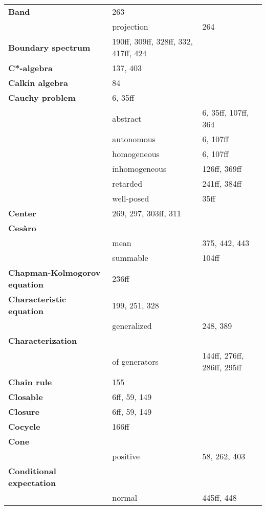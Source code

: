 \documentclass[10pt]{scrartcl}
\begin{document}
\begin{longtable}{>{\bfseries}p{5cm}p{4cm}p{4cm}p{4cm}}
Band 	& 263 \\
	& projection 	& 264 \\

Boundary spectrum 	& 190ff, 309ff, 328ff, 332, 417ff, 424 \\

C*-algebra 	& 137, 403 \\

Calkin algebra 	& 84 \\

Cauchy problem 	& 6, 35ff \\
	& abstract 	& 6, 35ff, 107ff, 364 \\
	& autonomous 	& 6, 107ff \\
	& homogeneous 	& 6, 107ff \\
	& inhomogeneous 	& 126ff, 369ff \\
	& retarded 	& 241ff, 384ff \\
	& well-posed 	& 35ff \\

Center 	& 269, 297, 303ff, 311 \\

Cesàro 	& \\
	& mean 	& 375, 442, 443 \\
	& summable 	& 104ff \\

Chapman-Kolmogorov equation 	& 236ff \\

Characteristic equation 	& 199, 251, 328 \\
	& generalized 	& 248, 389 \\

Characterization 	& \\
	& of generators 	& 144ff, 276ff, 286ff, 295ff \\

Chain rule 	& 155 \\

Closable 	& 6ff, 59, 149 \\

Closure 	& 6ff, 59, 149 \\

Cocycle 	& 166ff \\

Cone 	& \\
	& positive 	& 58, 262, 403 \\

Conditional expectation 	& \\
	& normal 	& 445ff, 448 \\


\end{longtable}
\end{document}
